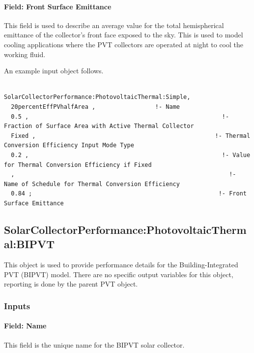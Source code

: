 \paragraph{Field: Front Surface Emittance}\label{field-front-surface-emittance}

This field is used to describe an average value for the total hemispherical emittance of the collector's front face exposed to the sky. This is used to model cooling applications where the PVT collectors are operated at night to cool the working fluid.

An example input object follows.

\begin{lstlisting}

SolarCollectorPerformance:PhotovoltaicThermal:Simple,
  20percentEffPVhalfArea ,                 !- Name
  0.5 ,                                                       !- Fraction of Surface Area with Active Thermal Collector
  Fixed ,                                                   !- Thermal Conversion Efficiency Input Mode Type
  0.2 ,                                                       !- Value for Thermal Conversion Efficiency if Fixed
  ,                                                             !- Name of Schedule for Thermal Conversion Efficiency
  0.84 ;                                                     !- Front Surface Emittance
\end{lstlisting}

\subsection{SolarCollectorPerformance:PhotovoltaicThermal:BIPVT}\label{solarcollectorperformancephotovoltaicthermalBIPVT}

This object is used to provide performance details for the Building-Integrated PVT (BIPVT) model. There are no specific output variables for this object, reporting is done by the parent PVT object.


\subsubsection{Inputs}\label{BIPVT-Inputs}

\paragraph{Field: Name}\label{BIPVT-field-name}

This field is the unique name for the BIPVT solar collector.

